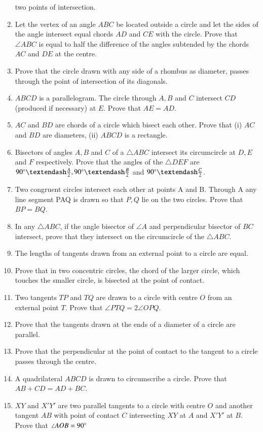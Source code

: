 \begin{enumerate}[label=\arabic*.,ref=\thesubsection.\theenumi]
two points of intersection.
\item Let the vertex of an angle $ABC$ be located outside a circle and let the sides of the angle
intersect equal chords $AD$ and $CE$ with the circle. Prove that $\angle ABC$ is equal to half the
difference of the angles subtended by the chords $AC$ and $DE$ at the centre.
\item Prove that the circle drawn with any side of a rhombus as diameter, passes through
the point of intersection of its diagonals.
\item $ABCD$ is a parallelogram. The circle through $A, B$ and $C$ intersect $CD$ (produced if
necessary) at $E$. Prove that $AE = AD$.
\item $AC$ and $BD$ are chords of a circle which bisect each other. Prove that (i) $AC$ and $BD$ are
diameters, (ii) $ABCD$ is a rectangle.
\item Bisectors of angles $A, B$ and $C$ of a $\triangle ABC$ intersect its circumcircle at $D, E$ and
$F$ respectively. Prove that the angles of the $\triangle DEF$ are $90\degree – \frac{A}{2}, 90\degree – \frac{B}{2}$ and $90\degree – \frac{C}{2}$.
\item Two congruent circles intersect each other at points A and B. Through A any line segment PAQ is drawn so that $P, Q$ lie on the two circles. Prove that $BP = BQ$.
\item In any $\triangle ABC$, if the angle bisector of $\angle A$ and perpendicular bisector of $BC$ intersect, prove that they intersect on the circumcircle of the $\triangle ABC$.
%
\item The lengths of tangents drawn from an external point to a circle are equal.
%
\item Prove that in two concentric circles, the chord of the larger circle, which touches the smaller circle, is bisected at the point of contact.
%
\item Two tangents $TP$ and $TQ$ are drawn to a circle with centre $O$ from an external point $T$. Prove that $\angle PTQ = 2 \angle OPQ$.
%
\item Prove that the tangents drawn at the ends of a diameter of a circle are parallel. 
\item  Prove that the perpendicular at the point of contact to the tangent to a circle passes through the centre.
\item A quadrilateral $ABCD$ is drawn to circumscribe a circle. Prove that 
$AB + CD = AD + BC$.
%
\item $XY$ and $X'Y'$ are two parallel tangents to a circle with centre $O$ and another tangent $AB$ with point of contact $C$ intersecting $XY$ at $A$ and $X'Y'$ at $B$. Prove that $\angle AOB = 90\degree$

\end{enumerate}
